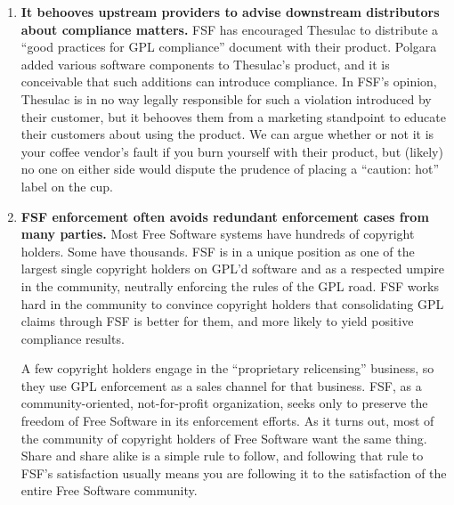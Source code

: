 \begin{enumerate}
\item {\bf It behooves upstream providers to advise downstream
  distributors about compliance matters.}  FSF has encouraged Thesulac to
  distribute a ``good practices for GPL compliance'' document with their
  product. Polgara added various software components to Thesulac's
  product, and it is conceivable that such additions can introduce
  compliance. In FSF's opinion, Thesulac is in no way legally responsible
  for such a violation introduced by their customer, but it behooves them
  from a marketing standpoint to educate their customers about using the
  product. We can argue whether or not it is your coffee vendor's fault
  if you burn yourself with their product, but (likely) no one on either
  side would dispute the prudence of placing a ``caution: hot'' label on
  the cup.

\item {\bf FSF enforcement often avoids redundant enforcement cases from
  many parties.}  Most Free Software systems have hundreds of copyright
  holders. Some have thousands. FSF is in a unique position as one of
  the largest single copyright holders on GPL'd software and as a
  respected umpire in the community, neutrally enforcing the rules of the
  GPL road. FSF works hard in the community to convince copyright
  holders that consolidating GPL claims through FSF is better for them,
  and more likely to yield positive compliance results.

  A few copyright holders engage in the ``proprietary relicensing''
  business, so they use GPL enforcement as a sales channel for that
  business. FSF, as a community-oriented, not-for-profit organization,
  seeks only to preserve the freedom of Free Software in its enforcement
  efforts. As it turns out, most of the community of copyright holders
  of Free Software want the same thing. Share and share alike is a
  simple rule to follow, and following that rule to FSF's satisfaction
  usually means you are following it to the satisfaction of the entire
  Free Software community.

\end{enumerate}




